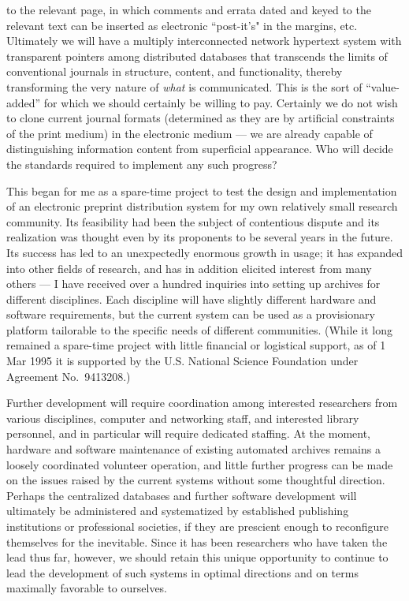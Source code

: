   to the relevant page,
  in which comments and errata dated and keyed to the relevant text
  can be inserted as electronic ``post-it's"  in the margins, etc.
  Ultimately we will have a multiply interconnected network
  hypertext system with transparent pointers among distributed databases
  that transcends the limits of conventional journals in structure, content,
  and functionality, thereby
  transforming the very nature of {\it what\/} is communicated. This is
  the sort of ``value-added'' for which we should certainly be willing to pay.
  Certainly we do not wish to clone current journal formats (determined as
  they are by artificial constraints of the print medium) in the
  electronic medium --- we are already capable of distinguishing information
  content from superficial appearance.
  Who will decide the standards required to implement any such progress?


\bigskip
This began for me as a spare-time project to test the design and implementation
of an electronic preprint distribution system for my own relatively small
research community. Its feasibility had been the subject of contentious dispute
and its realization was thought even by its proponents to be several years in
the future. Its success has led to an unexpectedly enormous growth in usage; it
has expanded into other fields of research, and has in addition elicited
interest from many others --- I have received over a hundred inquiries into
setting up archives for different disciplines. Each discipline will have
slightly different hardware and software requirements, but the current system
can be used as a provisionary platform tailorable to the specific needs of
different communities.
(While it long remained a spare-time project with
little financial or logistical support, as of 1 Mar 1995 it is supported
by the U.S. National Science Foundation under Agreement No.~9413208.)

Further development will require coordination among interested researchers from
various disciplines, computer and networking staff, and interested library
personnel, and in particular will require dedicated staffing. At the moment,
hardware and software maintenance of existing automated archives remains
a loosely coordinated volunteer operation, and little further progress can be
made on the issues raised by the current systems without some thoughtful
direction. Perhaps the centralized databases and further software development
will ultimately be administered and systematized by established publishing
institutions or professional societies, if they are prescient enough to
reconfigure themselves for the inevitable. Since it has been researchers who
have taken the lead thus far,
however, we should retain this unique opportunity to continue to lead the
development of such systems in optimal directions and on terms maximally
favorable to ourselves.


